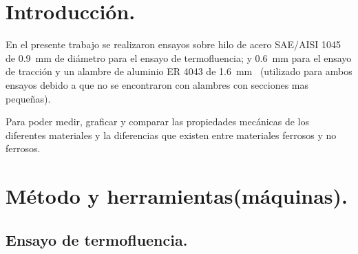 \documentclass[12pt,a4paper]{article}
\begin{document}

\newpage
\tableofcontents

\begin{abstract}
    Propiedades mecánicas de alambres e hilos (filamentos).
    \begin{itemize}
        \item Determinar el módulo de elasticidad, tensión de fluencia, tensión máxima, tensión de rotura, resiliencia y tenacidad de un alambre de material ferroso y de un alambre de material no ferroso. (Alambre: sección > 1 mm2).
        \item Determinar la pendiente de la curva de termofluencia para un hilo (filamento) de material ferroso y un material no ferroso. (Hilo: sección < 1 mm2).
        \item Verificar y contrastar los resultados obtenidos con la bibliografía de referencia (Ej: normas, libros, catálogos, etc.).
        \item CONDICIÓN: Para la realización de los ensayos deberán emplearse máquinas, dispositivos o equipos diseñados y construidos por los integrantes de cada equipo. No podrán emplearse máquinas, dispositivos o equipos comerciales.
    \end{itemize}
\end{abstract}

\section{Introducción.}

En el presente trabajo se realizaron ensayos sobre hilo de acero SAE/AISI 1045 de \SI{0,9}{\milli\metre} de diámetro para el ensayo de termofluencia; y \SI{0,6}{\milli\metre} para el ensayo de tracción y un alambre de aluminio ER 4043 de \SI{1,6}{\milli\metre\diameter} (utilizado para ambos ensayos debido a que no se encontraron con alambres con secciones mas pequeñas). 

Para poder medir, graficar y comparar las propiedades mecánicas de los diferentes materiales y la diferencias que existen entre materiales ferrosos y no ferrosos.

\section{Método y herramientas(máquinas).}

\subsection{Ensayo de termofluencia.}
\end{document}
